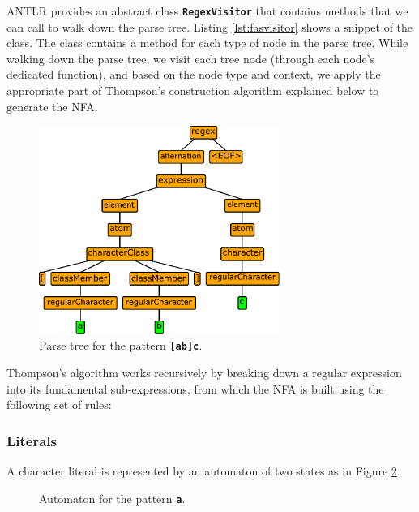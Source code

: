 ANTLR provides an abstract class \texttt{\textbf{RegexVisitor}} that contains methods that we can call to walk down the parse tree. Listing \ref{lst:fasvisitor} shows a snippet of the class. The class contains a method for each type of node in the parse tree. While walking down the parse tree, we visit each tree node (through each node's dedicated function), and based on the node type and context, we apply the appropriate part of Thompson's construction algorithm explained below to generate the NFA.

\begin{figure}[H]
    \centering
    \includegraphics[width=0.7\textwidth]{tree.pdf}
    \caption{Parse tree for the pattern \texttt{\textbf{[ab]c}}.}\label{fig:parsetree}
\end{figure}

Thompson's algorithm works recursively by breaking down a regular expression into its fundamental sub-expressions, from which the NFA is built using the following set of rules:

\subsubsection{Literals}
A character literal is represented by an automaton of two states as in Figure \ref{fig:auto1}.

\begin{figure}[htpb]
\centering
{}
\caption{Automaton for the pattern \texttt{\textbf{a}}.}\label{fig:auto1}
\end{figure}
